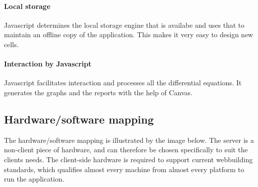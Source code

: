 \documentclass{report}
\begin{document}
				\paragraph{Local storage}
					Javascript determines the local storage engine that is availabe and uses that to maintain an offline copy of the application. This makes it very easy to design new cells. 
				\paragraph{Interaction by Javascript}
					Javascript facilitates interaction and processes all the differential equations. It generates the graphs and the reports with the help of Canvas. 
		\subsection{Hardware/software mapping}
			The hardware/software mapping is illustrated by the image below. The server is a non-client piece of hardware, and can therefore be chosen specifically to suit the clients needs. The client-side hardware is required to support current webbuilding standards, which qualifies almost every machine from almost every platform to run the application.\\
\end{document}
